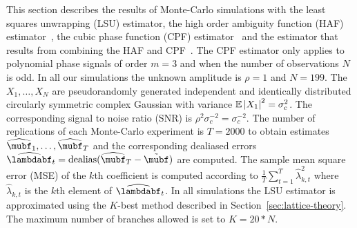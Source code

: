 \documentclass[journal]{IEEEtran}
\begin{document}

This section describes the results of Monte-Carlo simulations with the least squares unwrapping (LSU) estimator, the high order ambiguity function (HAF) estimator~\cite{Peleg_DPT_1995}, the cubic phase function (CPF) estimator~\cite{Oshea_cpf_2004} and the estimator that results from combining the HAF and CPF~\cite{Djurovic_haf_cpf_2012}.  The CPF estimator only applies to polynomial phase signals of order $m=3$ and when the number of observations $N$ is odd.  In all our simulations the unknown amplitude is $\rho = 1$ and $N = 199$.  The $X_1, \dots, X_N$ are pseudorandomly generated independent and identically distributed circularly symmetric complex Gaussian with variance ${\mathbb E}\left\vert X_1 \right\vert^2 = \sigma_c^2$.  The corresponding signal to noise ratio (SNR) is $\rho^2 \sigma_c^{-2} = \sigma_c^{-2}$.  The number of replications of each Monte-Carlo experiment is $T = 2000$ to obtain estimates $\widehat{\mubf}_1, \dots, \widehat{\mubf}_T$ and the corresponding dealiased errors $\widehat{\lambdabf}_t = \dealias(\widehat{\mubf}_T - \tilde{\mubf})$ are computed.  The sample mean square error (MSE) of the $k$th coefficient is computed according to $\tfrac{1}{T}\sum_{t=1}^T \widehat{\lambda}_{k,t}^2$ where $\widehat{\lambda}_{k,t}$ is the $k$th element of $\widehat{\lambdabf}_t$.  In all simulations the LSU estimator is approximated using the $K$-best method described in Section~\ref{sec:lattice-theory}.  The maximum number of branches allowed is set to $K=20*N$.
\end{document}
